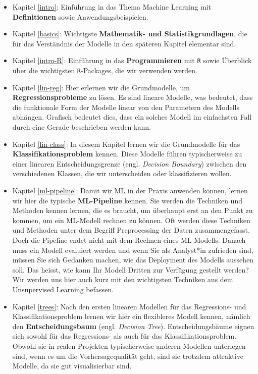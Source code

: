 \documentclass[
]{book}
\providecommand{\tightlist}{%
  \setlength{\itemsep}{0pt}\setlength{\parskip}{0pt}}
\begin{document}
\begin{itemize}
\tightlist
\item
  Kapitel \ref{intro}: Einführung in das Thema Machine Learning mit \textbf{Definitionen} sowie Anwendungsbeispielen.
\item
  Kapitel \ref{basics}: Wichtigste \textbf{Mathematik- und Statistikgrundlagen}, die für das Verständnis der Modelle in den späteren Kapitel elementar sind.
\item
  Kapitel \ref{intro-R}: Einführung in das \textbf{Programmieren} mit \texttt{R} sowie Überblick über die wichtigsten \texttt{R}-Packages, die wir verwenden werden.
\item
  Kapitel \ref{lin-reg}: Hier erlernen wir die Grundmodelle, um \textbf{Regressionsprobleme} zu lösen. Es sind lineare Modelle, was bedeutet, dass die funktionale Form der Modelle linear von den Parametern des Modells abhängen. Grafisch bedeutet dies, dass ein solches Modell im einfachsten Fall durch eine Gerade beschrieben werden kann.
\item
  Kapitel \ref{lin-class}: In diesem Kapitel lernen wir die Grundmodelle für das \textbf{Klassifikationsproblem} kennen. Diese Modelle führen typischerweise zu einer linearen Entscheidungsgrenze (engl. \emph{Decision Boundary}) zwischen den verschiedenen Klassen, die wir unterscheiden oder klassifizieren wollen.
\item
  Kapitel \ref{ml-pipeline}: Damit wir ML in der Praxis anwenden können, lernen wir hier die typische \textbf{ML-Pipeline} kennen. Sie werden die Techniken und Methoden kennen lernen, die es braucht, um überhaupt erst an den Punkt zu kommen, um ein ML-Modell rechnen zu können. Oft werden diese Techniken und Methoden unter dem Begriff Preprocessing der Daten zusammengefasst. Doch die Pipeline endet nicht mit dem Rechnen eines ML-Modells. Danach muss ein Modell evaluiert werden und wenn Sie als Analyst*in zufrieden sind, müssen Sie sich Gedanken machen, wie das Deployment des Modells aussehen soll. Das heisst, wie kann Ihr Modell Dritten zur Verfügung gestellt werden? Wir werden uns hier auch kurz mit den wichtigsten Techniken aus dem Unsupervised Learning befassen.
\item
  Kapitel \ref{trees}: Nach den ersten linearen Modellen für das Regressions- und Klassifikationsproblem lernen wir hier ein flexibleres Modell kennen, nämlich den \textbf{Entscheidungsbaum} (engl. \emph{Decision Tree}). Entscheidungsbäume eignen sich sowohl für das Regressions- als auch für das Klassifikationsproblem. Obwohl sie in realen Projekten typischerweise anderen Modellen unterlegen sind, wenn es um die Vorhersagequalität geht, sind sie trotzdem attraktive Modelle, da sie gut visualisierbar sind.

\end{itemize}
\end{document}
